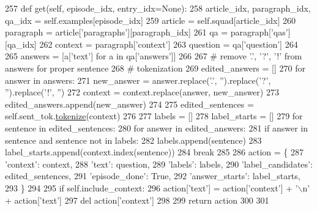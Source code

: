 \begin{DoxyCode}
257     \textcolor{keyword}{def }get(self, episode\_idx, entry\_idx=None):
258         article\_idx, paragraph\_idx, qa\_idx = self.examples[episode\_idx]
259         article = self.squad[article\_idx]
260         paragraph = article[\textcolor{stringliteral}{'paragraphs'}][paragraph\_idx]
261         qa = paragraph[\textcolor{stringliteral}{'qas'}][qa\_idx]
262         context = paragraph[\textcolor{stringliteral}{'context'}]
263         question = qa[\textcolor{stringliteral}{'question'}]
264 
265         answers = [a[\textcolor{stringliteral}{'text'}] \textcolor{keywordflow}{for} a \textcolor{keywordflow}{in} qa[\textcolor{stringliteral}{'answers'}]]
266 
267         \textcolor{comment}{# remove '.', '?', '!' from answers for proper sentence}
268         \textcolor{comment}{# tokenization}
269         edited\_answers = []
270         \textcolor{keywordflow}{for} answer \textcolor{keywordflow}{in} answers:
271             new\_answer = answer.replace(\textcolor{stringliteral}{'.'}, \textcolor{stringliteral}{''}).replace(\textcolor{stringliteral}{'?'}, \textcolor{stringliteral}{''}).replace(\textcolor{stringliteral}{'!'}, \textcolor{stringliteral}{''})
272             context = context.replace(answer, new\_answer)
273             edited\_answers.append(new\_answer)
274 
275         edited\_sentences = self.sent\_tok.\hyperlink{namespaceparlai_1_1agents_1_1tfidf__retriever_1_1build__tfidf_a1fdb457e98eb4e4c26047e229686a616}{tokenize}(context)
276 
277         labels = []
278         label\_starts = []
279         \textcolor{keywordflow}{for} sentence \textcolor{keywordflow}{in} edited\_sentences:
280             \textcolor{keywordflow}{for} answer \textcolor{keywordflow}{in} edited\_answers:
281                 \textcolor{keywordflow}{if} answer \textcolor{keywordflow}{in} sentence \textcolor{keywordflow}{and} sentence \textcolor{keywordflow}{not} \textcolor{keywordflow}{in} labels:
282                     labels.append(sentence)
283                     label\_starts.append(context.index(sentence))
284                     \textcolor{keywordflow}{break}
285 
286         action = \{
287             \textcolor{stringliteral}{'context'}: context,
288             \textcolor{stringliteral}{'text'}: question,
289             \textcolor{stringliteral}{'labels'}: labels,
290             \textcolor{stringliteral}{'label\_candidates'}: edited\_sentences,
291             \textcolor{stringliteral}{'episode\_done'}: \textcolor{keyword}{True},
292             \textcolor{stringliteral}{'answer\_starts'}: label\_starts,
293         \}
294 
295         \textcolor{keywordflow}{if} self.include\_context:
296             action[\textcolor{stringliteral}{'text'}] = action[\textcolor{stringliteral}{'context'}] + \textcolor{stringliteral}{'\(\backslash\)n'} + action[\textcolor{stringliteral}{'text'}]
297             del action[\textcolor{stringliteral}{'context'}]
298 
299         \textcolor{keywordflow}{return} action
300 
301 
\end{DoxyCode}


